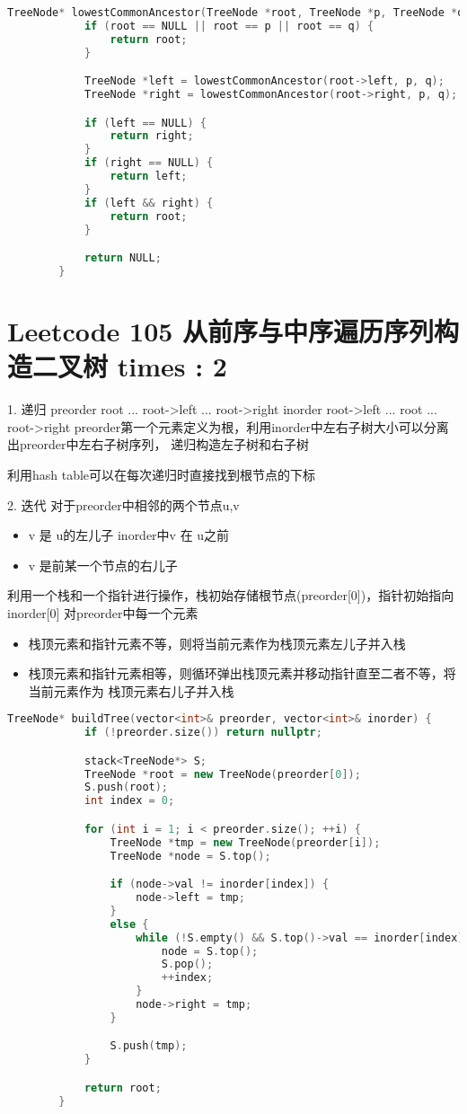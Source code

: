 \documentclass[UTF8]{ctexart}
\begin{document}
\begin{framed}
	\begin{lstlisting}[language=C++]
		TreeNode* lowestCommonAncestor(TreeNode *root, TreeNode *p, TreeNode *q) {
			if (root == NULL || root == p || root == q) {
				return root;
			}

			TreeNode *left = lowestCommonAncestor(root->left, p, q);
			TreeNode *right = lowestCommonAncestor(root->right, p, q);

			if (left == NULL) {
				return right;
			}
			if (right == NULL) {
				return left;
			}
			if (left && right) {
				return root;
			}

			return NULL;
		}
	\end{lstlisting}
\end{framed}

\section{Leetcode 105 从前序与中序遍历序列构造二叉树 times : 2}
1. 递归
preorder root ... root->left ... root->right
inorder  root->left ... root ... root->right
preorder第一个元素定义为根，利用inorder中左右子树大小可以分离出preorder中左右子树序列，
递归构造左子树和右子树

利用hash table可以在每次递归时直接找到根节点的下标

2. 迭代
对于preorder中相邻的两个节点u,v
\begin{itemize}
	\item v 是 u的左儿子 inorder中v 在 u之前
	\item v 是前某一个节点的右儿子 
\end{itemize}
利用一个栈和一个指针进行操作，栈初始存储根节点(preorder[0])，指针初始指向inorder[0]
对preorder中每一个元素
\begin{itemize}
	\item 栈顶元素和指针元素不等，则将当前元素作为栈顶元素左儿子并入栈
	\item 栈顶元素和指针元素相等，则循环弹出栈顶元素并移动指针直至二者不等，将当前元素作为
			栈顶元素右儿子并入栈
\end{itemize}
\begin{framed}
	\begin{lstlisting}[language=C++]
		TreeNode* buildTree(vector<int>& preorder, vector<int>& inorder) {
			if (!preorder.size()) return nullptr;

			stack<TreeNode*> S;
			TreeNode *root = new TreeNode(preorder[0]);
			S.push(root);
			int index = 0;

			for (int i = 1; i < preorder.size(); ++i) {
				TreeNode *tmp = new TreeNode(preorder[i]);
				TreeNode *node = S.top();

				if (node->val != inorder[index]) {
					node->left = tmp;
				}
				else {
					while (!S.empty() && S.top()->val == inorder[index]) {
						node = S.top();
						S.pop();
						++index;
					}
					node->right = tmp;
				}

				S.push(tmp);
			}

			return root;
		}
	\end{lstlisting}
\end{framed}
\end{document}

